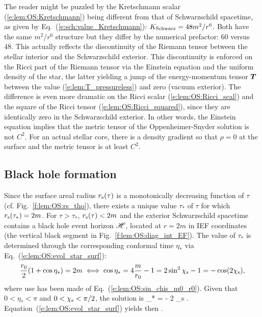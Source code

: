 \begin{remark}
The reader might be puzzled by the Kretschmann scalar (\ref{e:lem:OS:Kretschmann})
being different from that of Schwarzschild spacetime, as given by Eq.~(\ref{e:sch:value_Kretschmann}):
$K_{\rm Schwarz} = 48 m^2/r^6$. Both
have the same $m^2/r^6$ structure but they differ by the numerical prefactor: 60 versus 48.
This actually reflects the discontinuity of the Riemann tensor between the stellar interior
and the Schwarzschild exterior. This discontinuity is enforced on the Ricci part of the Riemann
tensor via the Einstein equation and the uniform density of the star, the latter yielding
a jump of the energy-momentum tensor $\bm{T}$ between the value (\ref{e:lem:T_pressureless})
and zero (vacuum exterior). The difference is even more dramatic on the Ricci scalar
(\ref{e:lem:OS:Ricci_scal})
and the square of the Ricci tensor (\ref{e:lem:OS:Ricci_squared}), since they are
identically zero in the Schwarzschild exterior. In other words, the Einstein equation
implies that the metric tensor of the Oppenheimer-Snyder solution is not $C^2$.
For an actual stellar core, there is a density gradient so that $\rho=0$
at the surface and the metric tensor is at least $C^2$.
\end{remark}


\subsection{Black hole formation} \label{s:lem:OS:BH_formation}

Since the surface areal radius $r_{\rm s}(\tau)$ is a monotonically decreasing function
of $\tau$ (cf. Fig.~\ref{f:lem:OS:rs_tho}), there exists a unique value $\tau_*$ of
$\tau$ for which $r_{\rm s}(\tau_*) = 2 m$. For $\tau>\tau_*$, $r_{\rm s}(\tau) < 2 m$
and the exterior
Schwarzschild spacetime contains a black hole event horizon $\mathscr{H}$, located
at $r=2m$ in IEF coordinates (the vertical black segment in Fig.~\ref{f:lem:OS:diag_int_EF}).
The value of $\tau_*$ is determined through the corresponding
conformal time $\eta_*$ via Eq.~(\ref{e:lem:OS:evol_star_surf}):
\[
    \frac{r_0}{2} (1 + \cos\eta_*) = 2 m \iff
    \cos\eta_* = 4\frac{m}{r_0} - 1 = 2 \sin^2\chi_{\rm s} - 1 = - \cos(2\chi_{\rm s}) ,
\]
where use has been made of Eq.~(\ref{e:lem:OS:sin_chis_m0_r0}). Given that $0<\eta_*<\pi$
and $0<\chi_{\rm s} < \pi/2$, the solution is
\be \label{e:lem:OS:eta_star}
    \eta_* = \pi - 2 \chi_{\rm s} .
\ee
Equation~(\ref{e:lem:OS:evol_star_surf}) yields then
\be \label{e:lem:OS:tau_star}
   .
\ee

